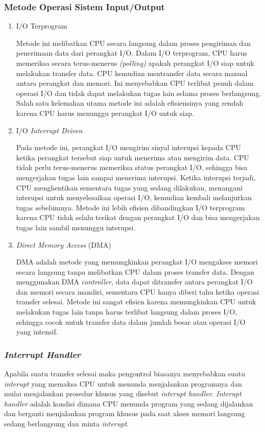 \documentclass[12pt]{article}
\begin{document}
\subsubsection{Metode Operasi Sistem Input/Output}
\begin{enumerate}
    \item I/O Terprogram \par
    Metode ini melibatkan CPU secara langsung dalam proses pengiriman dan penerimaan data dari perangkat I/O. Dalam I/O terprogram, CPU harus memeriksa secara terus-menerus \textit{(polling)} apakah perangkat I/O siap untuk melakukan transfer data. CPU kemudian mentransfer data secara manual antara perangkat dan memori. Ini menyebabkan CPU terlibat penuh dalam operasi I/O dan tidak dapat melakukan tugas lain selama proses berlangsung. Salah satu kelemahan utama metode ini adalah efisiensinya yang rendah karena CPU harus menunggu perangkat I/O untuk siap.
    \item I/O \emph{Interrupt Driven} \par
    Pada metode ini, perangkat I/O mengirim sinyal interupsi kepada CPU ketika perangkat tersebut siap untuk menerima atau mengirim data. CPU tidak perlu terus-menerus memeriksa status perangkat I/O, sehingga bisa mengerjakan tugas lain sampai menerima interupsi. Ketika interupsi terjadi, CPU menghentikan sementara tugas yang sedang dilakukan, menangani interupsi untuk menyelesaikan operasi I/O, kemudian kembali melanjutkan tugas sebelumnya. Metode ini lebih efisien dibandingkan I/O terprogram karena CPU tidak selalu terikat dengan perangkat I/O dan bisa mengerjakan tugas lain sambil menunggu interupsi.
    \item \emph{Direct Memory Access} (DMA) \par
    DMA adalah metode yang memungkinkan perangkat I/O mengakses memori secara langsung tanpa melibatkan CPU dalam proses transfer data. Dengan menggunakan DMA \emph{controller}, data dapat ditransfer antara perangkat I/O dan memori secara mandiri, sementara CPU hanya diberi tahu ketika operasi transfer selesai. Metode ini sangat efisien karena memungkinkan CPU untuk melakukan tugas lain tanpa harus terlibat langsung dalam proses I/O, sehingga cocok untuk transfer data dalam jumlah besar atau operasi I/O yang intensif.
\end{enumerate}

\subsubsection{\emph{Interrupt Handler}}
Apabila suatu transfer selesai maka pengontrol biasanya menyebabkan suatu \textit{interupt} yang memaksa CPU untuk menunda menjalankan programnya dan mulai menjalankan prosedur khusus yang disebut \emph{interupt handler}. \emph{Interupt handler} adalah kondisi dimana CPU menunda program yang sedang dijalankan dan berganti menjalankan program khusus pada saat akses memori langsung sedang berlangsung dan minta \emph{interupt}.
\end{document}
